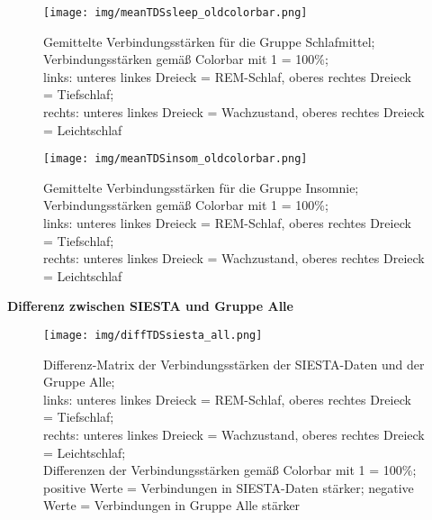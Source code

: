 \begin{figure}[H]
	\centering
	\texttt{[image: img/meanTDSsleep\_oldcolorbar.png]}
	\caption[Verbindungsstärken für die Gruppe Schlafmittel]{Gemittelte Verbindungsstärken für die Gruppe Schlafmittel;\\Verbindungsstärken gemäß Colorbar mit 1 = 100\%;\\links: unteres linkes Dreieck = \acs{REM}-Schlaf, oberes rechtes Dreieck = Tiefschlaf;\\rechts: unteres linkes Dreieck = Wachzustand, oberes rechtes Dreieck = Leichtschlaf}
	\label{fig:meanTDSsleep}
\end{figure}

\begin{figure}[H]
	\centering
	\texttt{[image: img/meanTDSinsom\_oldcolorbar.png]}
	\caption[Verbindungsstärken für die Gruppe Insomnie]{Gemittelte Verbindungsstärken für die Gruppe Insomnie;\\Verbindungsstärken gemäß Colorbar mit 1 = 100\%;\\links: unteres linkes Dreieck = \acs{REM}-Schlaf, oberes rechtes Dreieck = Tiefschlaf;\\rechts: unteres linkes Dreieck = Wachzustand, oberes rechtes Dreieck = Leichtschlaf}
	\label{fig:meanTDSinsom}
\end{figure}



\textbf{Differenz zwischen SIESTA und Gruppe Alle}

\begin{figure}[H]
	\centering
	\texttt{[image: img/diffTDSsiesta\_all.png]}
	\caption[Differenz-Matrix der Verbindungsstärken der SIESTA-Daten und der Gruppe Alle]{Differenz-Matrix der Verbindungsstärken der SIESTA-Daten und der Gruppe Alle;\\links: unteres linkes Dreieck = \acs{REM}-Schlaf, oberes rechtes Dreieck = Tiefschlaf;\\rechts: unteres linkes Dreieck = Wachzustand, oberes rechtes Dreieck = Leichtschlaf;\\Differenzen der Verbindungsstärken gemäß Colorbar mit 1 = 100\%;\\positive Werte = Verbindungen in SIESTA-Daten stärker; negative Werte = Verbindungen in Gruppe Alle stärker}
	\label{fig:diffTDSsiesta_all}
\end{figure}




